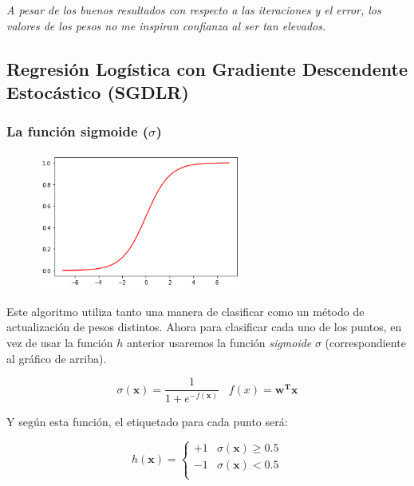 \documentclass{article}
\begin{document}
    \emph{A pesar de los buenos resultados con respecto a las iteraciones y el error, los valores de los
    pesos no me inspiran confianza al ser tan elevados.}
    
    \pagebreak

    \subsection{Regresión Logística con Gradiente Descendente Estocástico (SGDLR)}

    \subsubsection{La función sigmoide ($\sigma$)}

    \begin{figure}[h]
        \centering
        \includegraphics[width=0.6\textwidth]{sigmoid.png}
    \end{figure}

    Este algoritmo utiliza tanto una manera de clasificar como un método de
    actualización de pesos distintos. Ahora para clasificar cada uno de los puntos,
    en vez de usar la función $h$ anterior usaremos la función
    \emph{sigmoide} $\sigma$ (correspondiente al gráfico de arriba).

    \begin{equation*}
        \sigma (\textbf{x}) = \frac{1}{1 + e^{-f(\textbf{x})}} \;\;\; f(x) = \textbf{w}^\textbf{T}\textbf{x}
    \end{equation*}

    Y según esta función, el etiquetado para cada punto será:

    \begin{equation*}
        h(\textbf{x}) =
        \begin{cases}
            +1 & \sigma (\textbf{x}) \geq 0.5 \\
            -1 & \sigma (\textbf{x}) < 0.5 \\
        \end{cases}
    \end{equation*}
\end{document}
